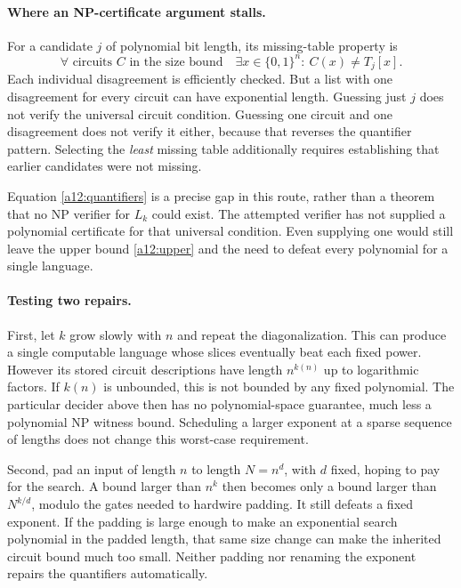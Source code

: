 \documentclass[11pt]{article}
\begin{document}
\paragraph{Where an NP-certificate argument stalls.}
For a candidate $j$ of polynomial bit length, its missing-table property is
\begin{equation}\label{a12:quantifiers}
 \forall\text{ circuits }C\text{ in the size bound}\quad
 \exists x\in\{0,1\}^n:\ C(x)\ne T_j[x].
\end{equation}
Each individual disagreement is efficiently checked. But a list with one
disagreement for every circuit can have exponential length. Guessing just
$j$ does not verify the universal circuit condition. Guessing one circuit
and one disagreement does not verify it either, because that reverses the
quantifier pattern. Selecting the \emph{least} missing table additionally
requires establishing that earlier candidates were not missing.

Equation \eqref{a12:quantifiers} is a precise gap in this route, rather than
a theorem that no NP verifier for $L_k$ could exist. The attempted verifier
has not supplied a polynomial certificate for that universal condition.
Even supplying one would still leave the upper bound \eqref{a12:upper} and
the need to defeat every polynomial for a single language.

\paragraph{Testing two repairs.}
First, let $k$ grow slowly with $n$ and repeat the diagonalization. This can
produce a single computable language whose slices eventually beat each
fixed power. However its stored circuit descriptions have length
$n^{k(n)}$ up to logarithmic factors. If $k(n)$ is unbounded, this is not
bounded by any fixed polynomial. The particular decider above then has no
polynomial-space guarantee, much less a polynomial NP witness bound.
Scheduling a larger exponent at a sparse sequence of lengths does not
change this worst-case requirement.

Second, pad an input of length $n$ to length $N=n^d$, with $d$ fixed, hoping
to pay for the search. A bound larger than $n^k$ then becomes only a bound
larger than $N^{k/d}$, modulo the gates needed to hardwire padding. It still
defeats a fixed exponent. If the padding is large enough to make an
exponential search polynomial in the padded length, that same size change
can make the inherited circuit bound much too small. Neither padding nor
renaming the exponent repairs the quantifiers automatically.
\end{document}
